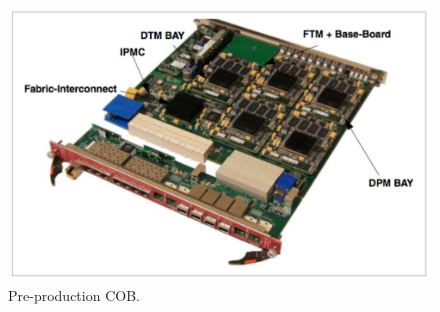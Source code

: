 \begin{figure}[tbh]
\includegraphics[scale=0.8]{cob-photo.pdf}
\caption{Pre-production COB.  }
\label{fig:cob}
\end{figure} 


